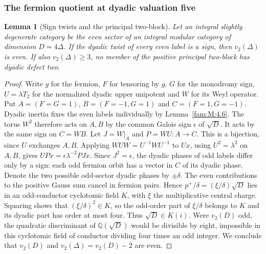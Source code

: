 \documentclass[11pt,a4paper]{article}
\numberwithin{equation}{section}
\newtheorem{lemma}[theorem]{Lemma}
\theoremstyle{remark}
\newcommand{\QQ}{\mathbb Q}
\begin{document}
\subsubsection{The fermion quotient at dyadic valuation five}\label{fam:Q:sec:5.3}\label{fam:Q:n:q12:fermion}
\begin{lemma}[Sign twists and the principal two-block]\label{fam:Q:5.9}\label{fam:Q:n:q12:fs-square}
Let an integral slightly degenerate category be the even sector
of an integral modular category of dimension $D=4\Delta$. If the dyadic twist of every even label is a sign,
then $v_2(\Delta)$ is even. If also $v_2(\Delta)\ge3$, no member
of the positive principal two-block has dyadic defect two.
\end{lemma}
\begin{proof}
Write $g$ for the fermion, $F$ for tensoring by $g$, $G$ for
the monodromy sign, $U=\lambda T_2$ for the normalized dyadic
upper unipotent and $W$ for its Weyl operator. Put
$A=(F=G=1)$, $B=(F=-1,G=1)$ and $C=(F=1,G=-1)$.
Dyadic inertia fixes the even labels individually by
Lemma~\ref{fam:M:4.6}. The torus $W^2$ therefore acts on $A,B$
by the common Galois sign $\epsilon$ of $\sqrt D$. It acts by
the same sign on $C=WB$. Let $J=W|_A$ and $P=WU:A\to C$.
This is a bijection, since $U$ exchanges $A,B$. Applying
$WUW=U^{-1}WU^{-1}$ to $Ux$, using $U^2=\lambda^2$ on $A,B$,
gives $UPx=\epsilon\lambda^{-2}PJx$. Since $J^2=\epsilon$,
the dyadic phases of odd labels differ only by a sign: each
odd fermion orbit has a vector in $C$ of its dyadic phase.
Denote the two possible odd-sector dyadic phases by $\pm\delta$.
The even contributions to the positive Gauss sum cancel in fermion
pairs. Hence $p^+/\delta=(\xi/\delta)\sqrt D$ lies in an
odd-conductor cyclotomic field $K$, with $\xi$ the multiplicative
central charge. Squaring shows that $(\xi/\delta)^2\in K$, so
the odd-order part of $\xi/\delta$ belongs to $K$ and its dyadic
part has order at most four. Thus $\sqrt D\in K(i)$. Were
$v_2(D)$ odd, the quadratic discriminant of $\QQ(\sqrt D)$ would
be divisible by eight, impossible in this cyclotomic field of
conductor dividing four times an odd integer. We conclude that
$v_2(D)$ and $v_2(\Delta)=v_2(D)-2$ are even.


\end{proof}
\end{document}
